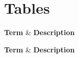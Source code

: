 \chapter{Tables}

\let\oldlongtable\longtable
\let\endoldlongtable\endlongtable
\renewenvironment{longtable}{\oldlongtable} {\endoldlongtable}

\begin{longtable}[l]{| p{40mm} | p{95mm} |}
    \hline
        \textbf{Term} & \textbf{Description}\\
    \hline
    
    \endfirsthead
    
    \hline
        \textbf{Term} & \textbf{Description}\\
    \hline
    

\end{longtable}
